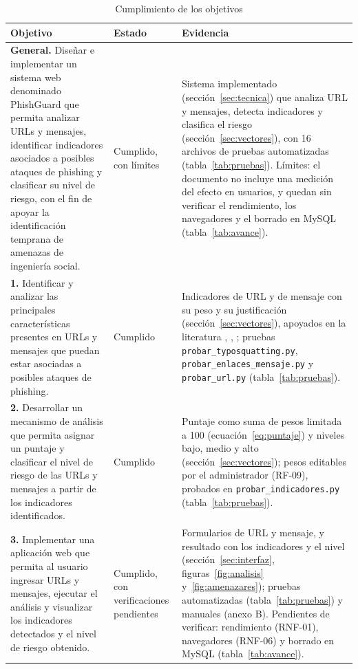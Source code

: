 \documentclass[journal,onecolumn,12pt,draftclsnofoot]{IEEEtran}
\begin{document}
\begin{table}[htbp]
\centering
\caption{Cumplimiento de los objetivos}\label{tab:objetivos}
\small
\setlength{\tabcolsep}{4pt}
\begin{tabular}{|p{}|p{}|p{}|}
\hline
\textbf{Objetivo} & \textbf{Estado} & \textbf{Evidencia} \\ \hline
\textbf{General.} Diseñar e implementar un sistema web denominado PhishGuard que permita analizar URLs y mensajes, identificar indicadores asociados a posibles ataques de phishing y clasificar su nivel de riesgo, con el fin de apoyar la identificación temprana de amenazas de ingeniería social. & Cumplido, con límites & Sistema implementado (sección~\ref{sec:tecnica}) que analiza URL y mensajes, detecta indicadores y clasifica el riesgo (sección~\ref{sec:vectores}), con 16 archivos de pruebas automatizadas (tabla~\ref{tab:pruebas}). Límites: el documento no incluye una medición del efecto en usuarios, y quedan sin verificar el rendimiento, los navegadores y el borrado en MySQL (tabla~\ref{tab:avance}). \\ \hline
\textbf{1.} Identificar y analizar las principales características presentes en URLs y mensajes que puedan estar asociadas a posibles ataques de phishing. & Cumplido & Indicadores de URL y de mensaje con su peso y su justificación (sección~\ref{sec:vectores}), apoyados en la literatura \cite{hong}, \cite{jeeva}, \cite{yeboah}; pruebas \texttt{probar\_typosquatting.py}, \texttt{probar\_enlaces\_mensaje.py} y \texttt{probar\_url.py} (tabla~\ref{tab:pruebas}). \\ \hline
\textbf{2.} Desarrollar un mecanismo de análisis que permita asignar un puntaje y clasificar el nivel de riesgo de las URLs y mensajes a partir de los indicadores identificados. & Cumplido & Puntaje como suma de pesos limitada a 100 (ecuación~\eqref{eq:puntaje}) y niveles bajo, medio y alto (sección~\ref{sec:vectores}); pesos editables por el administrador (RF-09), probados en \texttt{probar\_indicadores.py} (tabla~\ref{tab:pruebas}). \\ \hline
\textbf{3.} Implementar una aplicación web que permita al usuario ingresar URLs y mensajes, ejecutar el análisis y visualizar los indicadores detectados y el nivel de riesgo obtenido. & Cumplido, con verificaciones pendientes & Formularios de URL y mensaje, y resultado con los indicadores y el nivel (sección~\ref{sec:interfaz}, figuras~\ref{fig:analisis} y~\ref{fig:amenazares}); pruebas automatizadas (tabla~\ref{tab:pruebas}) y manuales (anexo B). Pendientes de verificar: rendimiento (RNF-01), navegadores (RNF-06) y borrado en MySQL (tabla~\ref{tab:avance}). \\ \hline
\end{tabular}
\end{table}
\end{document}
